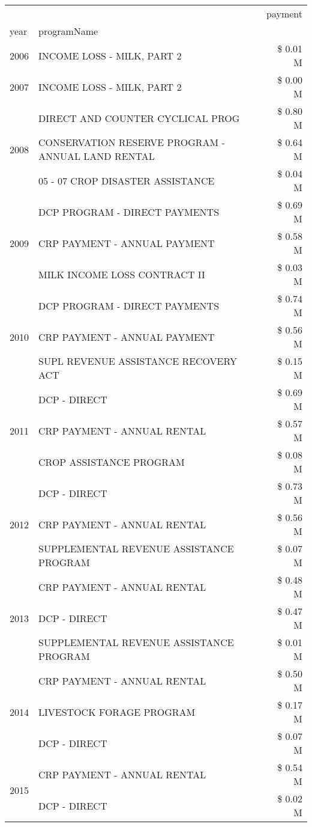 \begin{tabular}{llr}
\toprule
 &  & payment \\
year & programName &  \\
\midrule
2006 & INCOME LOSS - MILK, PART 2 & \$ 0.01 M \\
\cline{1-3}
2007 & INCOME LOSS - MILK, PART 2 & \$ 0.00 M \\
\cline{1-3}
\multirow[t]{3}{*}{2008} & DIRECT AND COUNTER CYCLICAL PROG & \$ 0.80 M \\
 & CONSERVATION RESERVE PROGRAM - ANNUAL LAND RENTAL & \$ 0.64 M \\
 & 05 - 07 CROP DISASTER ASSISTANCE & \$ 0.04 M \\
\cline{1-3}
\multirow[t]{3}{*}{2009} & DCP PROGRAM - DIRECT PAYMENTS & \$ 0.69 M \\
 & CRP PAYMENT - ANNUAL PAYMENT & \$ 0.58 M \\
 & MILK INCOME LOSS CONTRACT II & \$ 0.03 M \\
\cline{1-3}
\multirow[t]{3}{*}{2010} & DCP PROGRAM - DIRECT PAYMENTS & \$ 0.74 M \\
 & CRP PAYMENT - ANNUAL PAYMENT & \$ 0.56 M \\
 & SUPL REVENUE ASSISTANCE RECOVERY ACT & \$ 0.15 M \\
\cline{1-3}
\multirow[t]{3}{*}{2011} & DCP - DIRECT & \$ 0.69 M \\
 & CRP PAYMENT - ANNUAL RENTAL & \$ 0.57 M \\
 & CROP ASSISTANCE PROGRAM & \$ 0.08 M \\
\cline{1-3}
\multirow[t]{3}{*}{2012} & DCP - DIRECT & \$ 0.73 M \\
 & CRP PAYMENT - ANNUAL RENTAL & \$ 0.56 M \\
 & SUPPLEMENTAL REVENUE ASSISTANCE PROGRAM & \$ 0.07 M \\
\cline{1-3}
\multirow[t]{3}{*}{2013} & CRP PAYMENT - ANNUAL RENTAL & \$ 0.48 M \\
 & DCP - DIRECT & \$ 0.47 M \\
 & SUPPLEMENTAL REVENUE ASSISTANCE PROGRAM & \$ 0.01 M \\
\cline{1-3}
\multirow[t]{3}{*}{2014} & CRP PAYMENT - ANNUAL RENTAL & \$ 0.50 M \\
 & LIVESTOCK FORAGE PROGRAM & \$ 0.17 M \\
 & DCP - DIRECT & \$ 0.07 M \\
\cline{1-3}
\multirow[t]{3}{*}{2015} & CRP PAYMENT - ANNUAL RENTAL & \$ 0.54 M \\
 & DCP - DIRECT & \$ 0.02 M \\

\end{tabular}
